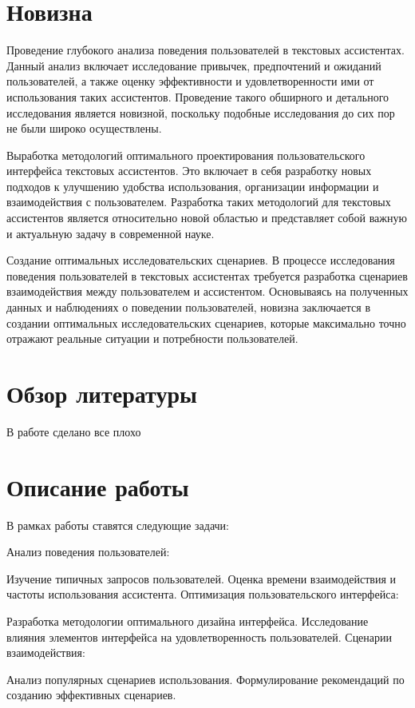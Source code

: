 \documentclass{article}
\begin{document}
\section{Новизна}

Проведение глубокого анализа поведения пользователей в текстовых ассистентах. Данный анализ включает исследование привычек, предпочтений и ожиданий пользователей, а также оценку эффективности и удовлетворенности ими от использования таких ассистентов. Проведение такого обширного и детального исследования является новизной, поскольку подобные исследования до сих пор не были широко осуществлены.

Выработка методологий оптимального проектирования пользовательского интерфейса текстовых ассистентов. Это включает в себя разработку новых подходов к улучшению удобства использования, организации информации и взаимодействия с пользователем. Разработка таких методологий для текстовых ассистентов является относительно новой областью и представляет собой важную и актуальную задачу в современной науке.

Создание оптимальных исследовательских сценариев. В процессе исследования поведения пользователей в текстовых ассистентах требуется разработка сценариев взаимодействия между пользователем и ассистентом. Основываясь на полученных данных и наблюдениях о поведении пользователей, новизна заключается в создании оптимальных исследовательских сценариев, которые максимально точно отражают реальные ситуации и потребности пользователей.
\section{Обзор литературы}
В работе \cite{greenwade93} сделано все плохо
\section{Описание работы}
В рамках работы ставятся следующие задачи:

Анализ поведения пользователей:

Изучение типичных запросов пользователей.
Оценка времени взаимодействия и частоты использования ассистента.
Оптимизация пользовательского интерфейса:

Разработка методологии оптимального дизайна интерфейса.
Исследование влияния элементов интерфейса на удовлетворенность пользователей.
Сценарии взаимодействия:

Анализ популярных сценариев использования.
Формулирование рекомендаций по созданию эффективных сценариев.
\end{document}
